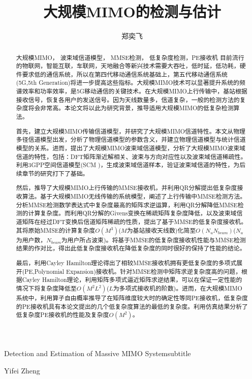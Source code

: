 \documentclass[bachelor,nocolorlinks, printoneside]{seuthesis} %
\begin{document}

\title{大规模MIMO的检测与估计}{}{Detection and Estimation of Massive MIMO System}{subtitle}
\author{郑奕飞}{Yifei Zheng}

\address{无线谷1405室}
\maketitle

\begin{abstract}{大规模MIMO， 波束域信道模型， MMSE检测， 低复杂度检测，PE接收机}
目前流行的物联网，智能互联，车联网，天地融合等新兴技术需要大吞吐，低时延，低功耗，硬件要求低的通信系统，所以在第四代移动通信系统基础上，第五代移动通信系统(5G,5th Generation)将进一步提高这些指标。大规模MIMO技术可以显著提升系统的频谱效率和功率效率，是5G移动通信的关键技术。在大规模MIMO上行传输中，基站根据接收信号，恢复各用户的发送信号。因为天线数量多，信道复杂，一般的检测方法的复杂度将会非常高。本论文将以此为研究背景，推导适用大规模MIMO的低复杂检测算法。

首先，建立大规模MIMO传输信道模型，并研究了大规模MIMO信道特性。本文从物理多径信道模型出发，分析了物理信道模型的参数含义，并建立物理信道模型与统计信道模型的关系。进而，提出了大规模MIMO波束域信道模型，分析了大规模MIMO波束域信道的特性，包括：DFT矩阵渐近解相关、波束与方向对应性以及波束域信道稀疏性。利用3GPP空间信道模型(SCM
)，生成波束域信道样本，验证波束域信道的特性，为后续章节的研究打下了基础。

然后，推导了大规模MIMO上行传输的MMSE接收机，并利用QR分解提出低复杂度接收算法。基于大规模MIMO无线传输的系统模型，阐述了上行传输中MMSE检测方法。分析MMSE检测数学表达式中复杂度最高的矩阵求逆运算，利用QR分解降低MMSE检测的计算复杂度。而利用QR分解的Givens变换在稀疏矩阵复杂度降低，以及波束域信道矩阵在经过DFT变换后信道矩阵稀疏的性质，提出了基于MMSE的低复杂度接收机。其将原始MMSE的计算复杂度$O(M^3)$($M$为基站接收天线数)化简至$O(N_uN_{beam})$($N_u$为用户数，$N_{beam}$为用户所占波束)。将基于MMSE的低复杂度接收机性能与MMSE检测结果的作对比，得出此低复杂度接收机在降低复杂度的同时很好的保持了性能的结论。

最后，利用Cayley Hamilton理论得出了相较MMSE接收机拥有更低复杂度的多项式展开(PE,Polynomial Expansion)接收机。针对MMSE检测中矩阵求逆复杂度高的问题，根据Cayley Hamilton理论，利用矩阵多项式逼近矩阵求逆结果，可以在保证一定性能的情况下将复杂度降低至$O(M^2L^2)$($L$为多项式接收机的阶数)。进而，在大规模MIMO系统中，利用算子自由概率推导了在矩阵维度较大时的确定性等同PE接收机，低复杂度的PE接收机具有本论文提出的几个低复杂度算法的最低的复杂度。利用仿真结果分析了低复杂度PE接收机的性能及复杂度$O(M^2)$。
\end{abstract}
\end{document}
